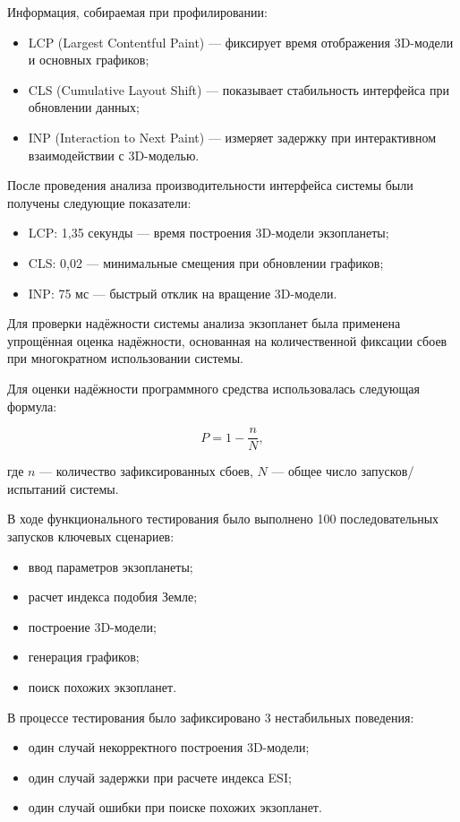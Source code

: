 Информация, собираемая при профилировании:
\begin{itemize}
    \item LCP (Largest Contentful Paint) --- фиксирует время отображения 3D-модели и основных графиков;
    \item CLS (Cumulative Layout Shift) --- показывает стабильность интерфейса при обновлении данных;
    \item INP (Interaction to Next Paint) --- измеряет задержку при интерактивном взаимодействии с 3D-моделью.
\end{itemize}

После проведения анализа производительности интерфейса системы были получены следующие показатели:

\begin{itemize}
    \item LCP: 1,35 секунды --- время построения 3D-модели экзопланеты;
    \item CLS: 0,02 --- минимальные смещения при обновлении графиков;
    \item INP: 75 мс --- быстрый отклик на вращение 3D-модели.
\end{itemize}

Для проверки надёжности системы анализа экзопланет была применена упрощённая оценка надёжности, основанная на количественной фиксации сбоев при многократном использовании системы.

Для оценки надёжности программного средства использовалась следующая формула:

\begin{equation}
\label{eq:reliability}
P = 1 - \frac{n}{N},
\end{equation}

где $n$ --- количество зафиксированных сбоев,  
$N$ --- общее число запусков/испытаний системы.

В ходе функционального тестирования было выполнено 100 последовательных запусков ключевых сценариев:
\begin{itemize}
    \item ввод параметров экзопланеты;
    \item расчет индекса подобия Земле;
    \item построение 3D-модели;
    \item генерация графиков;
    \item поиск похожих экзопланет.
\end{itemize}

В процессе тестирования было зафиксировано 3 нестабильных поведения:
\begin{itemize}
    \item один случай некорректного построения 3D-модели;
    \item один случай задержки при расчете индекса ESI;
    \item один случай ошибки при поиске похожих экзопланет.
\end{itemize}

